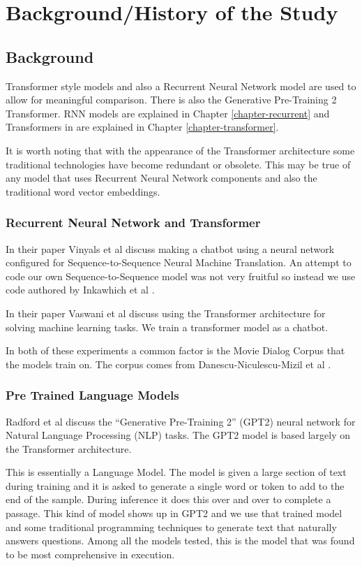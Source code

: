 \chapter{Background/History of the Study}
\section{Background}
Transformer style models and also a Recurrent Neural Network model are used to allow for meaningful comparison. There is also the Generative Pre-Training 2 Transformer. \ac{RNN} models are explained in Chapter \ref{chapter-recurrent} and Transformers in are explained in Chapter \ref{chapter-transformer}.

It is worth noting that with the appearance of the Transformer architecture some traditional technologies have become redundant or obsolete. This may be true of any model that uses Recurrent Neural Network components and also the traditional word vector embeddings.

\subsection{Recurrent Neural Network and Transformer}

In their paper Vinyals et al \cite{DBLP:journals/corr/VinyalsL15} discuss making a chatbot using a neural network configured for Sequence-to-Sequence Neural Machine Translation. An attempt to code our own Sequence-to-Sequence model was not very fruitful so instead we use code authored by Inkawhich et al \cite{2018Inkawhich}.

In their paper Vaswani et al \cite{Vaswani2017AttentionIA} discuss using the Transformer architecture for solving machine learning tasks. We train a transformer model as a chatbot.

In both of these experiments a common factor is the Movie Dialog Corpus that the models train on. The corpus comes from Danescu-Niculescu-Mizil et al \cite{Danescu-Niculescu-Mizil+Lee:11a}.

\subsection{Pre Trained Language Models}
Radford et al \cite{radford2019language} discuss the ``Generative Pre-Training 2'' (GPT2) neural network for Natural Language Processing (\ac{NLP}) tasks. The GPT2 model is based largely on the Transformer architecture. 

This is essentially a Language Model. The model is given a large section of text during training and it is asked to generate a single word or token to add to the end of the sample. During inference it does this over and over to complete a passage. This kind of model shows up in GPT2 and we use that trained model and some traditional programming techniques to generate text that naturally answers questions. Among all the models tested, this is the model that was found to be most comprehensive in execution.

